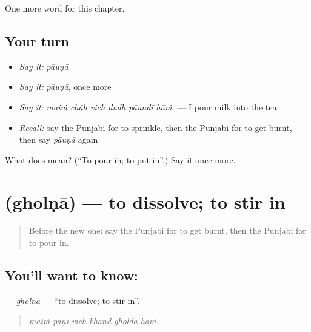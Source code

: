 \begin{grammarlens}[title={What you've built}]
One more word for this chapter.
\end{grammarlens}

\subsection*{Your turn}
\begin{itemize}
\raggedright
  \item \emph{Say it:} \emph{pāuṇā}
  \item \emph{Say it:} \emph{pāuṇā}, once more
  \item \emph{Say it:} \emph{maiṁ chāh vich dudh pāundī hāṁ.} — I pour milk into the tea.
  \item \emph{Recall:} say the Punjabi for to sprinkle, then the Punjabi for to get burnt, then say \emph{pāuṇā} again
\end{itemize}

\begin{tcolorbox}[breakable,colback=teal!4,colframe=teal!35!black,title={Before you move on}]
What does  mean? (\textquotedblleft{}To pour in; to put in\textquotedblright{}.) Say it once more.
\end{tcolorbox}
\section[\texorpdfstring{\pa{ਘੋਲਣਾ} (gholṇā)}{ਘੋਲਣਾ (gholṇā)}]{ (gholṇā) — to dissolve; to stir in}

\label{lesson:PA-C243-gholna}



\begin{quote}
Before the new one: say the Punjabi for to get burnt, then the Punjabi for to pour in.
\end{quote}

\subsection*{You'll want to know: }
\textbf{} — \emph{gholṇā} — \textquotedblleft{}to dissolve; to stir in\textquotedblright{}.

\begin{quote}
     
\end{quote}

\begin{quote}
\emph{maiṁ pāṇī vich khaṇḍ gholdā hāṁ.}
\end{quote}

